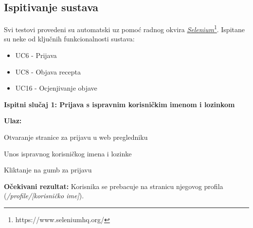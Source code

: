 			
			
			\subsection{Ispitivanje sustava}
			
			 
		 	
		 	Svi testovi provedeni su automatski uz pomoć radnog okvira \href{https://www.seleniumhq.org}{\textit{Selenium}\footnote{\url{https://www.seleniumhq.org/}}}. Ispitane su neke od ključnih funkcionalnosti sustava:
		 	\begin{itemize}
		 		\item UC6 - Prijava
		 		\item UC8 - Objava recepta
		 		\item UC16 - Ocjenjivanje objave
		 	\end{itemize}
		 	
		 	\noindent\textbf{Ispitni slučaj 1: Prijava s ispravnim korisničkim imenom i lozinkom}
		 	
			\noindent\textbf{Ulaz:}
			\begin{packed_enum}
				\item Otvaranje stranice za prijavu u web pregledniku
				\item Unos ispravnog korisničkog imena i lozinke
				\item Kliktanje na gumb za prijavu
			\end{packed_enum}
			\textbf{Očekivani rezultat:} Korisnika se prebacuje na stranicu njegovog profila (\textit{/profile/[korisničko ime]}).
			
